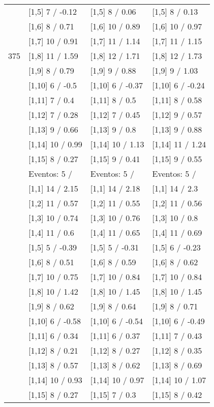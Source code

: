 \begin{table}
\begin{tabular}[t]{llll}
 & {}[1,5] 7  / -0.12 & {}[1,5] 8  / 0.06 & {}[1,5] 8  / 0.13\\
 & {}[1,6] 8  / 0.71 & {}[1,6] 10  / 0.89 & {}[1,6] 10  / 0.97\\
 & {}[1,7] 10  / 0.91 & {}[1,7] 11  / 1.14 & {}[1,7] 11  / 1.15\\
375 & {}[1,8] 11  / 1.59 & {}[1,8] 12  / 1.71 & {}[1,8] 12  / 1.73\\
\addlinespace
 & {}[1,9] 8  / 0.79 & {}[1,9] 9  / 0.88 & {}[1,9] 9  / 1.03\\
 & {}[1,10] 6  / -0.5 & {}[1,10] 6  / -0.37 & {}[1,10] 6  / -0.24\\
 & {}[1,11] 7  / 0.4 & {}[1,11] 8  / 0.5 & {}[1,11] 8  / 0.58\\
 & {}[1,12] 7  / 0.28 & {}[1,12] 7  / 0.45 & {}[1,12] 9  / 0.57\\
 & {}[1,13] 9  / 0.66 & {}[1,13] 9  / 0.8 & {}[1,13] 9  / 0.88\\
\addlinespace
 & {}[1,14] 10  / 0.99 & {}[1,14] 10  / 1.13 & {}[1,14] 11  / 1.24\\
 & {}[1,15] 8  / 0.27 & {}[1,15] 9  / 0.41 & {}[1,15] 9  / 0.55\\
 & Eventos:  5 / & Eventos:  5 / & Eventos:  5 /\\
 & {}[1,1] 14  / 2.15 & {}[1,1] 14  / 2.18 & {}[1,1] 14  / 2.3\\
 & {}[1,2] 11  / 0.57 & {}[1,2] 11  / 0.55 & {}[1,2] 11  / 0.56\\
\addlinespace
 & {}[1,3] 10  / 0.74 & {}[1,3] 10  / 0.76 & {}[1,3] 10  / 0.8\\
 & {}[1,4] 11  / 0.6 & {}[1,4] 11  / 0.65 & {}[1,4] 11  / 0.69\\
 & {}[1,5] 5  / -0.39 & {}[1,5] 5  / -0.31 & {}[1,5] 6  / -0.23\\
 & {}[1,6] 8  / 0.51 & {}[1,6] 8  / 0.59 & {}[1,6] 8  / 0.62\\
 & {}[1,7] 10  / 0.75 & {}[1,7] 10  / 0.84 & {}[1,7] 10  / 0.84\\
\addlinespace
500 & {}[1,8] 10  / 1.42 & {}[1,8] 10  / 1.45 & {}[1,8] 10  / 1.45\\
 & {}[1,9] 8  / 0.62 & {}[1,9] 8  / 0.64 & {}[1,9] 8  / 0.71\\
 & {}[1,10] 6  / -0.58 & {}[1,10] 6  / -0.54 & {}[1,10] 6  / -0.49\\
 & {}[1,11] 6  / 0.34 & {}[1,11] 6  / 0.37 & {}[1,11] 7  / 0.43\\
 & {}[1,12] 8  / 0.21 & {}[1,12] 8  / 0.27 & {}[1,12] 8  / 0.35\\
\addlinespace
 & {}[1,13] 8  / 0.57 & {}[1,13] 8  / 0.62 & {}[1,13] 8  / 0.69\\
 & {}[1,14] 10  / 0.93 & {}[1,14] 10  / 0.97 & {}[1,14] 10  / 1.07\\
 & {}[1,15] 8  / 0.27 & {}[1,15] 7  / 0.3 & {}[1,15] 8  / 0.42\\
\bottomrule
\end{tabular}
\end{table}
